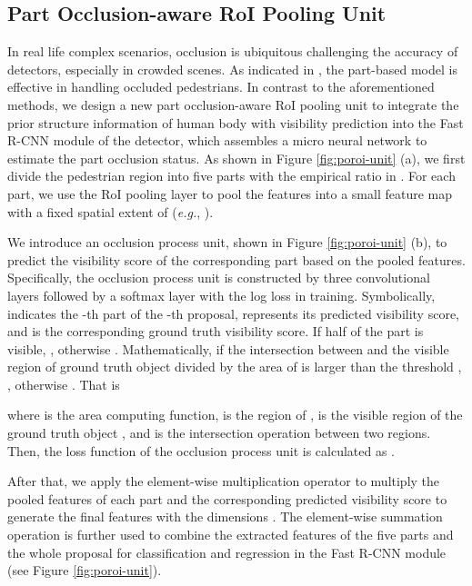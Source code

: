 \documentclass[runningheads]{llncs}
\def\eg{{\em e.g.}}
\begin{document}
\subsection{Part Occlusion-aware RoI Pooling Unit}
\label{sec:poroi-unit}
In real life complex scenarios, occlusion is ubiquitous challenging the accuracy of detectors, especially in crowded scenes. As indicated in \cite{DBLP:conf/cvpr/OuyangW12,DBLP:conf/iccv/TianLWT15,DBLP:conf/iccv/ZhouY17}, the part-based model is effective in handling occluded pedestrians. In contrast to the aforementioned methods, we design a new part occlusion-aware RoI pooling unit to integrate the prior structure information of human body with visibility prediction into the Fast R-CNN module of the detector, which assembles a micro neural network to estimate the part occlusion status. As shown in Figure \ref{fig:poroi-unit} (a), we first divide the pedestrian region into five parts with the empirical ratio in \cite{DBLP:journals/pami/FelzenszwalbGMR10}. For each part, we use the RoI pooling layer \cite{DBLP:conf/iccv/Girshick15} to pool the features into a small feature map with a fixed spatial extent of  (\eg, ).

We introduce an occlusion process unit, shown in Figure \ref{fig:poroi-unit} (b), to predict the visibility score of the corresponding part based on the pooled features. Specifically, the occlusion process unit is constructed by three convolutional layers followed by a softmax layer with the log loss in training. Symbolically,  indicates the -th part of the -th proposal,  represents its predicted visibility score, and  is the corresponding ground truth visibility score. If half of the part  is visible, , otherwise . Mathematically, if the intersection between  and the visible region of ground truth object divided by the area of  is larger than the threshold , , otherwise . That is

where  is the area computing function,  is the region of ,  is the visible region of the ground truth object , and  is the intersection operation between two regions. Then, the loss function of the occlusion process unit is calculated as .

After that, we apply the element-wise multiplication operator to multiply the pooled features of each part and the corresponding predicted visibility score to generate the final features with the dimensions . The element-wise summation operation is further used to combine the extracted features of the five parts and the whole proposal for classification and regression in the Fast R-CNN module (see Figure \ref{fig:poroi-unit}).
\end{document}

